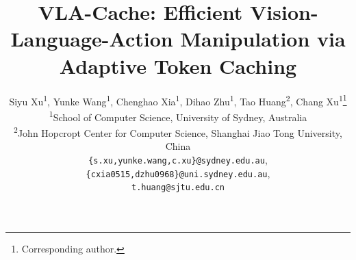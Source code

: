 \documentclass{article}
\title{VLA-Cache: Efficient Vision-Language-Action Manipulation via Adaptive Token Caching}
\author{%
  Siyu Xu\textsuperscript{1}, Yunke Wang\textsuperscript{1}, Chenghao Xia\textsuperscript{1}, Dihao Zhu\textsuperscript{1}, Tao Huang\textsuperscript{2}, Chang Xu\textsuperscript{1}\thanks{Corresponding author.}\\
  \textsuperscript{1}School of Computer Science, University of Sydney, Australia\\
  \textsuperscript{2}John Hopcropt Center for Computer Science, Shanghai Jiao Tong University, China\\
  \small{\texttt{\{s.xu,yunke.wang,c.xu\}@sydney.edu.au},\texttt{\{cxia0515,dzhu0968\}@uni.sydney.edu.au}},\\
  \small{\texttt{t.huang@sjtu.edu.cn}} \\
}
\begin{document}
\maketitle











\appendix
\onecolumn
% 

\end{document}
